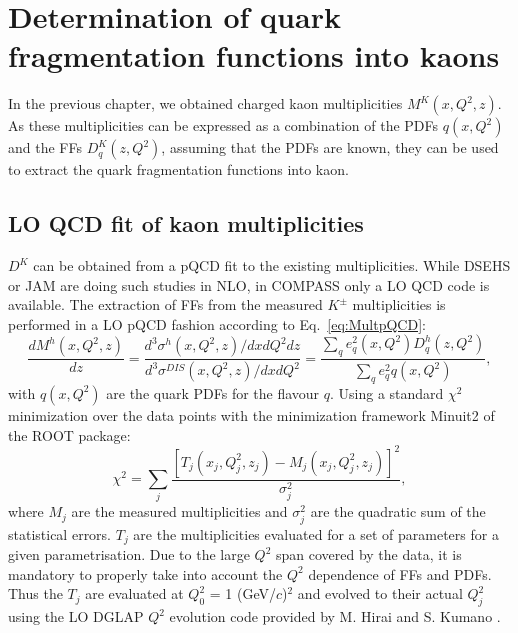 
\chapter{Determination of quark fragmentation functions into kaons} %

\label{ch:FF} %


In the previous chapter, we obtained charged kaon multiplicities $M^K(x,Q^2,z)$. As these multiplicities can be expressed as a combination of the PDFs $q(x,Q^2)$ and the FFs $D^K_q(z,Q^2)$, assuming that the PDFs are known, they can be used to extract the quark fragmentation functions into kaon.



\section{LO QCD fit of kaon multiplicities}

$D^K$ can be obtained from a pQCD fit to the existing multiplicities. While DSEHS or JAM are doing such studies in NLO, in COMPASS only a LO QCD code is available. The extraction of FFs from the measured $K^{\pm}$ multiplicities is performed in a LO pQCD fashion according to Eq.~\ref{eq:MultpQCD}:
%
\begin{equation}
  \frac{dM^h(x,Q^2,z)}{dz} = \frac{d^3\sigma^h(x,Q^2,z)/dxdQ^2dz}{d^3\sigma^{DIS}(x,Q^2,z)/dxdQ^2} = \frac{\sum_q e^2_q(x,Q^2)D^h_q(z,Q^2)}{\sum_q e^2_qq(x,Q^2)},
\end{equation}
%
with $q(x,Q^2)$ are the quark PDFs for the flavour $q$. Using a standard $\chi^2$ minimization over the data points with the minimization framework Minuit2 of the ROOT package:
%
\begin{equation} \label{eq:MultpQCD}
  \chi^2 = \sum_j \frac{\left[T_j\left(x_j,Q^2_j,z_j\right) - M_j\left(x_j,Q^2_j,z_j\right)\right]^2}{\sigma^2_j},
\end{equation}
%
where $M_j$ are the measured multiplicities and $\sigma^2_j$ are the quadratic sum of the statistical errors. $T_j$ are the multiplicities evaluated for a set of parameters for a given parametrisation. Due to the large $Q^2$ span covered by the data, it is mandatory to properly take into account the $Q^2$ dependence of FFs and PDFs. Thus the $T_j$ are evaluated at $Q^2_0$ = 1 (GeV/$c$)$^2$ and evolved to their actual $Q^2_j$ using the LO DGLAP $Q^2$ evolution code provided by M. Hirai and S. Kumano \cite{HKNS}.


